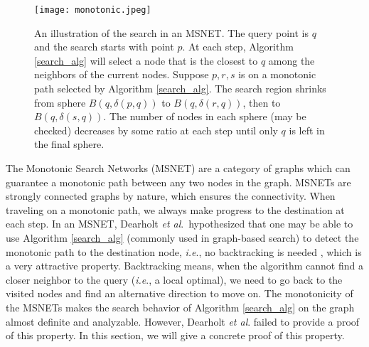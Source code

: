 \documentclass{vldb}
\def\ie {\emph{i.e}.} \def\Ie{\emph{I.e}.}
\def\etal{\emph{et al}.}
\begin{document}
\begin{figure}[t]
\begin{center}
\texttt{[image: monotonic.jpeg]}
\end{center}
   \caption{An illustration of the search in an MSNET. The query point is $q$ and the search starts with point $p$. At each step, Algorithm \ref{search_alg} will select a node that is the closest to $q$ among the neighbors of the current nodes. Suppose $p,r,s$ is on a monotonic path selected by Algorithm \ref{search_alg}. The search region shrinks from sphere $B(q,\delta(p,q))$ to $B(q,\delta(r,q))$, then to $B(q,\delta(s,q))$. The number of nodes in each sphere (may be checked) decreases by some ratio at each step until only $q$ is left in the final sphere.}
\label{monotonic}
\end{figure}

The Monotonic Search Networks (MSNET) \cite{dearholt1988monotonic} are a category of graphs which can guarantee a monotonic path between any two nodes in the graph. MSNETs are strongly connected graphs by nature, which ensures the connectivity. When traveling on a monotonic path, we always make progress to the destination at each step. In an MSNET, Dearholt \etal ~hypothesized that one may be able to use Algorithm \ref{search_alg} (commonly used in graph-based search) to detect the monotonic path to the destination node, \ie , no backtracking is needed \cite{dearholt1988monotonic}, which is a very attractive property. Backtracking means, when the algorithm cannot find a closer neighbor to the query (\ie, a local optimal), we need to go back to the visited nodes and find an alternative direction to move on. The monotonicity of the MSNETs makes the search behavior of Algorithm \ref{search_alg} on the graph almost definite and analyzable. However, Dearholt \etal \cite{dearholt1988monotonic} failed to provide a proof of this property. In this section, we will give a concrete proof of this property.


\end{document}
